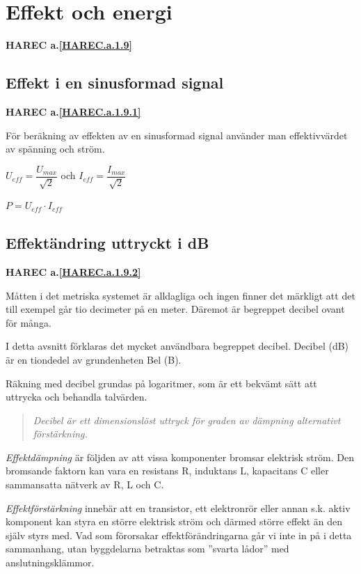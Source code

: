 \section{Effekt och energi}
\textbf{HAREC a.\ref{HAREC.a.1.9}\label{myHAREC.a.1.9}}
\label{effect och energi}

\subsection{Effekt i en sinusformad signal}
\textbf{HAREC a.\ref{HAREC.a.1.9.1}\label{myHAREC.a.1.9.1}}

För beräkning av effekten av en sinusformad signal använder man effektivvärdet
av spänning och ström.

\(U_{eff} = \dfrac{U_{max}}{\sqrt{2}}\) och \(I_{eff} = \dfrac{I_{max}}{\sqrt{2}}\)

\(P = U_{eff} \cdot I_{eff}\)

\subsection{Effektändring uttryckt i dB}
\textbf{HAREC a.\ref{HAREC.a.1.9.2}\label{myHAREC.a.1.9.2}}
\label{decibel}

Måtten i det metriska systemet är alldagliga och ingen finner det märkligt att
det till exempel går tio decimeter på en meter.
Däremot är begreppet decibel ovant för många.

I detta avsnitt förklaras det mycket användbara begreppet decibel.
Decibel (dB) är en tiondedel av grundenheten Bel (B).

Räkning med decibel grundas på logaritmer, som är ett bekvämt sätt att uttrycka
och behandla talvärden.

\begin{quote}\emph{
Decibel är ett dimensionslöst uttryck för graden av dämpning alternativt
förstärkning.
}\end{quote}

\emph{Effektdämpning} är följden av att vissa komponenter bromsar elektrisk
ström.
Den bromsande faktorn kan vara en resistans R, induktans L, kapacitans C eller
sammansatta nätverk av R, L och C.

\emph{Effektförstärkning} innebär att en transistor, ett elektronrör eller
annan s.k. aktiv komponent kan styra en större elektrisk ström och därmed
större effekt än den själv styrs med.
Vad som förorsakar effektförändringarna går vi inte in på i detta sammanhang,
utan byggdelarna betraktas som ''svarta lådor'' med anslutningsklämmor.

